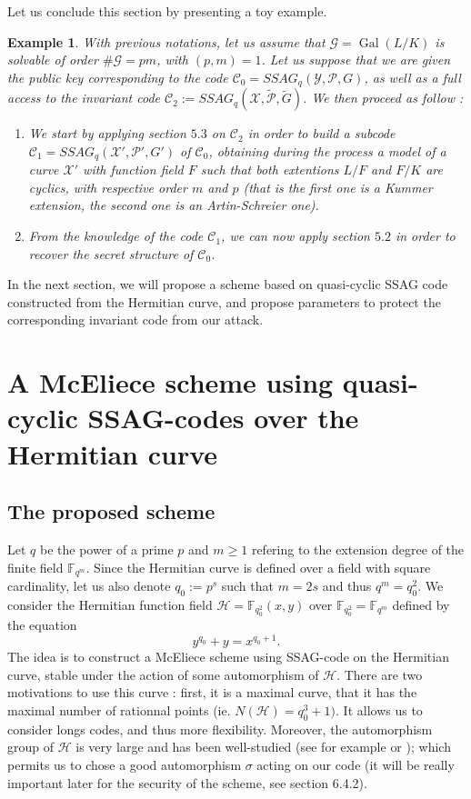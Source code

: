 \documentclass[10pt]{article}
\newtheorem{expl}[thm]{Example}
\newcommand{\s}{\vspace{0.3cm}}
\newcommand{\C}{\mathcal{C}}
\newcommand{\fqm}{\mathbb{F}_{q^m}}
\newcommand{\X}{\mathcal{X}}
\newcommand{\Y}{\mathcal{Y}}
\newcommand{\PR}{\mathcal{P}}
\newcommand{\G}{\mathcal{G}}
\newcommand{\Gal}{\operatorname{Gal}}
\begin{document}
Let us conclude this section by presenting a toy example.

\begin{expl} With previous notations, let us assume that $\G=\Gal( L/K)$ is solvable of order $\#\G = pm$, with $(p,m)=1$. Let us suppose that we are given the public key corresponding to the code $\C_0 = SSAG_q(\Y,\PR,G)$, as well as a full access to the invariant code $\C_2 := SSAG_q(\X,\tilde{\PR},\tilde{G})$. We then proceed as follow : 
\begin{enumerate}
\item[1.] We start by applying section $5.3$ on $\C_2$ in order to build a subcode $\C_1 = SSAG_q(\X',\PR',G')$ of $\C_0$, obtaining during the process a model of a curve $\X'$ with function field $F$ such that both extentions $L/F$ and $F/K$ are cyclics, with respective order $m$ and $p$ (that is the first one is a Kummer extension, the second one is an Artin-Schreier one).
\item[2.] From the knowledge of the code $\C_1$, we can now apply section $5.2$ in order to recover the secret structure of $\C_0$.
\end{enumerate}
\end{expl}

\s

In the next section, we will propose a scheme based on quasi-cyclic SSAG code constructed from the Hermitian curve, and propose parameters to protect the corresponding invariant code from our attack.

\s

\section{A McEliece scheme using quasi-cyclic SSAG-codes over the Hermitian curve}

\s

\subsection{The proposed scheme}

\s

Let $q$ be the power of a prime $p$ and $m \geq 1$ refering to the extension degree of the finite field $\fqm$. Since the Hermitian curve is defined over a field with square cardinality, let us also denote $q_0:=p^s$ such that $m=2s$ and thus $q^m = q_0^2$. We consider the Hermitian function field $\mathcal{H} = \mathbb{F}_{q_0^2}(x,y)$ over $\mathbb{F}_{q_0^2}=\fqm$ defined by the equation
\[y^{q_0}+y=x^{q_0+1}.\]
The idea is to construct a McEliece scheme using SSAG-code on the Hermitian curve, stable under the action of some automorphism of $\mathcal{H}$. There are two motivations to use this curve : first, it is a maximal curve, that it has the maximal number of rationnal points (ie. $N(\mathcal{H})=q_0^3+1)$. It allows us to consider longs codes, and thus more flexibility. Moreover, the automorphism group of $\mathcal{H}$ is very large and has been well-studied (see for example \cite{Sti} or \cite{Gar}); which permits us to chose a good automorphism $\sigma$ acting on our code (it will be really important later for the security of the scheme, see section 6.4.2). 
\end{document}
